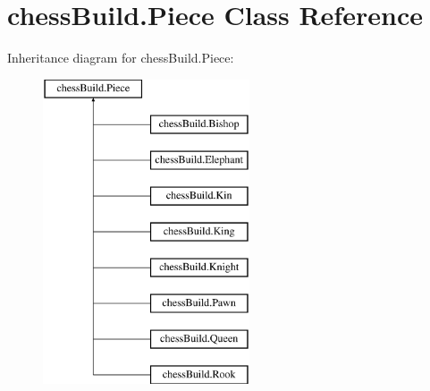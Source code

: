 \hypertarget{classchess_build_1_1_piece}{}\section{chess\+Build.\+Piece Class Reference}
\label{classchess_build_1_1_piece}
Inheritance diagram for chess\+Build.\+Piece\+:\begin{figure}[H]
\begin{center}
\leavevmode
\includegraphics[height=9.000000cm]{classchess_build_1_1_piece}
\end{center}
\end{figure}
